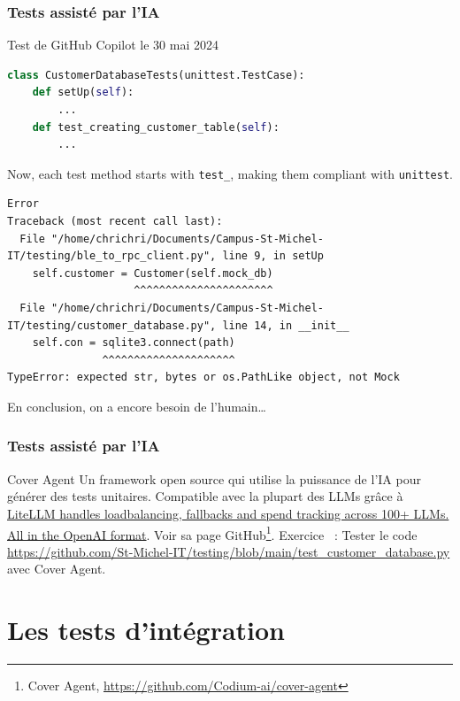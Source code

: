 \documentclass{beamer}
\begin{document}
    \begin{frame}[fragile]
        \transdissolve
        \frametitle{Tests assisté par l'IA}{Test de GitHub Copilot le 30 mai 2024}
        \begin{lstlisting}[language=Python]
class CustomerDatabaseTests(unittest.TestCase):
    def setUp(self):
        ...
    def test_creating_customer_table(self):
        ...
        \end{lstlisting}
        Now, each test method starts with \lstinline{test_}, making them compliant with \lstinline{unittest}.
        \begin{lstlisting}
Error
Traceback (most recent call last):
  File "/home/chrichri/Documents/Campus-St-Michel-IT/testing/ble_to_rpc_client.py", line 9, in setUp
    self.customer = Customer(self.mock_db)
                    ^^^^^^^^^^^^^^^^^^^^^^
  File "/home/chrichri/Documents/Campus-St-Michel-IT/testing/customer_database.py", line 14, in __init__
    self.con = sqlite3.connect(path)
               ^^^^^^^^^^^^^^^^^^^^^
TypeError: expected str, bytes or os.PathLike object, not Mock
        \end{lstlisting}
        En conclusion, on a encore besoin de l'humain\ldots
    \end{frame}

    \begin{frame}[fragile]
        \transdissolve
        \frametitle{Tests assisté par l'IA}{Cover Agent}
        Un framework open source qui utilise la puissance de l'IA pour générer des tests unitaires.
        Compatible avec la plupart des LLMs grâce à \href{https://www.litellm.ai/}{LiteLLM handles loadbalancing, fallbacks and spend tracking across 100+ LLMs. All in the OpenAI format}.
        Voir sa page GitHub\footnote{Cover Agent, \url{https://github.com/Codium-ai/cover-agent}}.
        \bigbreak
        Exercice \execcounterdispinc{}~: Tester le code \url{https://github.com/St-Michel-IT/testing/blob/main/test_customer_database.py} avec Cover Agent.
    \end{frame}


    \section{Les tests d’intégration}\label{sec:les-tests-d-integration}
\end{document}
